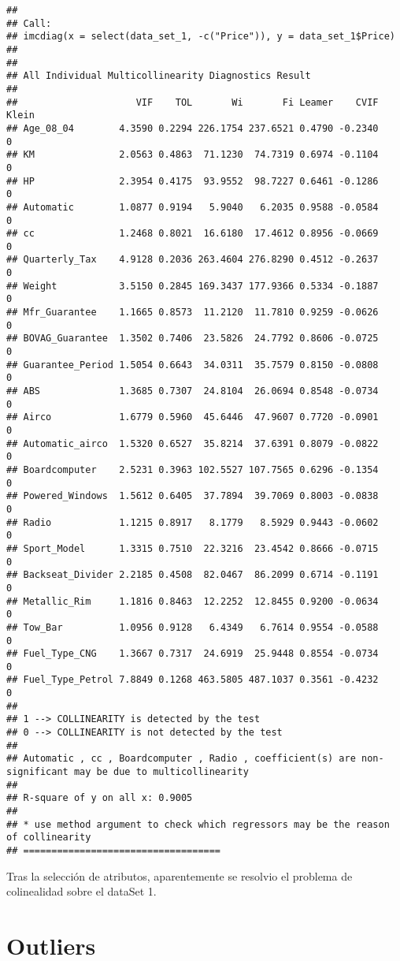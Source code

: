 \documentclass[]{article}
\begin{document}
\begin{verbatim}
## 
## Call:
## imcdiag(x = select(data_set_1, -c("Price")), y = data_set_1$Price)
## 
## 
## All Individual Multicollinearity Diagnostics Result
## 
##                     VIF    TOL       Wi       Fi Leamer    CVIF Klein
## Age_08_04        4.3590 0.2294 226.1754 237.6521 0.4790 -0.2340     0
## KM               2.0563 0.4863  71.1230  74.7319 0.6974 -0.1104     0
## HP               2.3954 0.4175  93.9552  98.7227 0.6461 -0.1286     0
## Automatic        1.0877 0.9194   5.9040   6.2035 0.9588 -0.0584     0
## cc               1.2468 0.8021  16.6180  17.4612 0.8956 -0.0669     0
## Quarterly_Tax    4.9128 0.2036 263.4604 276.8290 0.4512 -0.2637     0
## Weight           3.5150 0.2845 169.3437 177.9366 0.5334 -0.1887     0
## Mfr_Guarantee    1.1665 0.8573  11.2120  11.7810 0.9259 -0.0626     0
## BOVAG_Guarantee  1.3502 0.7406  23.5826  24.7792 0.8606 -0.0725     0
## Guarantee_Period 1.5054 0.6643  34.0311  35.7579 0.8150 -0.0808     0
## ABS              1.3685 0.7307  24.8104  26.0694 0.8548 -0.0734     0
## Airco            1.6779 0.5960  45.6446  47.9607 0.7720 -0.0901     0
## Automatic_airco  1.5320 0.6527  35.8214  37.6391 0.8079 -0.0822     0
## Boardcomputer    2.5231 0.3963 102.5527 107.7565 0.6296 -0.1354     0
## Powered_Windows  1.5612 0.6405  37.7894  39.7069 0.8003 -0.0838     0
## Radio            1.1215 0.8917   8.1779   8.5929 0.9443 -0.0602     0
## Sport_Model      1.3315 0.7510  22.3216  23.4542 0.8666 -0.0715     0
## Backseat_Divider 2.2185 0.4508  82.0467  86.2099 0.6714 -0.1191     0
## Metallic_Rim     1.1816 0.8463  12.2252  12.8455 0.9200 -0.0634     0
## Tow_Bar          1.0956 0.9128   6.4349   6.7614 0.9554 -0.0588     0
## Fuel_Type_CNG    1.3667 0.7317  24.6919  25.9448 0.8554 -0.0734     0
## Fuel_Type_Petrol 7.8849 0.1268 463.5805 487.1037 0.3561 -0.4232     0
## 
## 1 --> COLLINEARITY is detected by the test 
## 0 --> COLLINEARITY is not detected by the test
## 
## Automatic , cc , Boardcomputer , Radio , coefficient(s) are non-significant may be due to multicollinearity
## 
## R-square of y on all x: 0.9005 
## 
## * use method argument to check which regressors may be the reason of collinearity
## ===================================
\end{verbatim}

Tras la selección de atributos, aparentemente se resolvio el problema de
colinealidad sobre el dataSet 1.

\hypertarget{outliers}{%
\section{Outliers}\label{outliers}}
\end{document}
